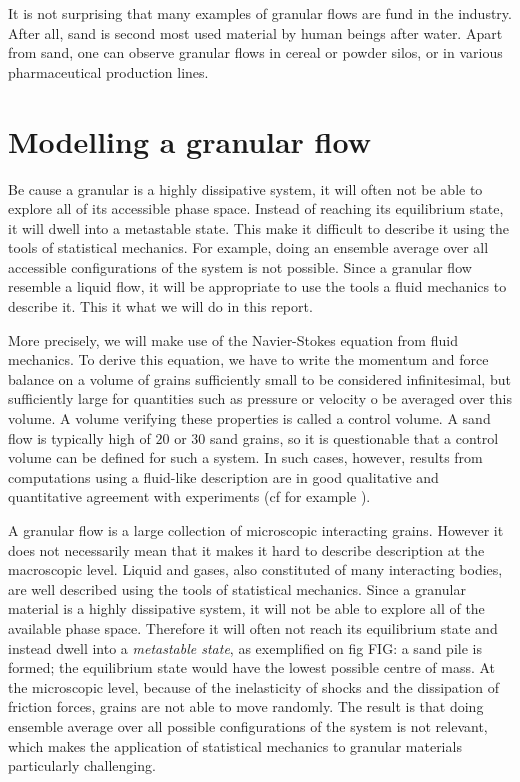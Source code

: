 \documentclass[11pt,a4paper]{report}
\begin{document}
It is not surprising that many examples of granular flows are fund in the industry. After all, sand is second most used material by human beings after water. 
Apart from sand, one can observe granular flows in cereal or powder silos, or in various pharmaceutical production lines.

\section{Modelling a granular flow}

Be cause a granular is a highly dissipative system, it will often not be able to explore all of its accessible phase space. Instead of reaching its equilibrium state, it will dwell into a metastable state.
This make it difficult to describe it using the tools of statistical mechanics. For example, doing an ensemble average over all accessible configurations of the system is not possible.
Since a granular flow resemble a liquid flow, it will be appropriate to use the tools a fluid mechanics to describe it. This it what we will do in this report.

More precisely, we will make use of the Navier-Stokes equation from fluid mechanics. To derive this equation, we have to write the momentum and force balance on a volume of grains sufficiently small to be considered infinitesimal, but sufficiently large for quantities such as pressure or velocity o be averaged over this volume. A volume verifying these properties is called a control volume. 
A sand flow is typically high of $20$ or $30$ sand grains, so it is questionable that a control volume can be defined for such a system. In such cases,  however, results from computations using a fluid-like description are in good qualitative and quantitative agreement with experiments (cf for example \cite{midi}).

A granular flow is a large collection of microscopic interacting grains. However it does not necessarily mean that it makes it hard to describe description at the macroscopic level. 
Liquid and gases, also constituted of many interacting bodies, are well described using the tools of statistical mechanics.
Since a granular material is a highly dissipative system, it will not be able to explore all of the available phase space. Therefore it will often not reach its equilibrium state and instead dwell into a \textit{metastable state}, as exemplified on fig FIG: a sand pile is formed; the equilibrium state would have the lowest possible centre of mass.
At the microscopic level, because of the inelasticity of shocks and the dissipation of friction forces, grains are not able to move randomly. 
The result is that doing ensemble average over all possible configurations of the system is not relevant, which makes the application of statistical mechanics to granular materials particularly challenging.
\end{document}
